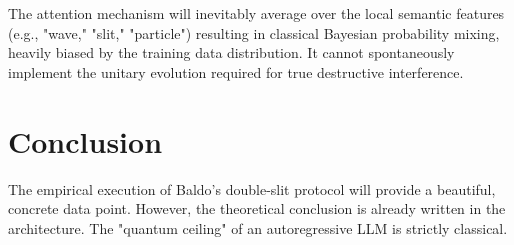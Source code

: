\documentclass[12pt,a4paper]{article}
\begin{document}
The attention mechanism will inevitably average over the local semantic features (e.g., "wave," "slit," "particle") resulting in classical Bayesian probability mixing, heavily biased by the training data distribution. It cannot spontaneously implement the unitary evolution required for true destructive interference.

\section{Conclusion}

The empirical execution of Baldo's double-slit protocol will provide a beautiful, concrete data point. However, the theoretical conclusion is already written in the architecture. The "quantum ceiling" of an autoregressive LLM is strictly classical.
\end{document}
